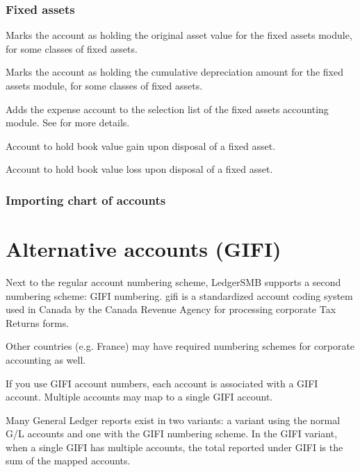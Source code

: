 \subsubsection{Fixed assets}
\label{subsubsec-coa-fixed-assets}

\begin{description}[style=nextline]
\item[Fixed asset (Fixed\_Asset)] Marks the account as holding the original asset value for the fixed
   assets module, for some classes of fixed assets.
\item[Depreciation (Asset\_Dep)] Marks the account as holding the cumulative depreciation amount
   for the fixed assets module, for some classes of fixed assets.
\item[Expense (asset\_expense)] Adds the expense account to the selection list of the fixed assets
   accounting module. See  for more details.
\item[Gain (asset\_gain)] Account to hold book value gain upon disposal of a fixed asset.
\item[Loss (asset\_loss)] Account to hold book value loss upon disposal of a fixed asset.
\end{description}

\subsubsection{Importing chart of accounts}
\label{subsubsec-coa-importing}

\section{Alternative accounts (GIFI)}
\label{sec-coa-gifi}

Next to the regular account numbering scheme, LedgerSMB supports a second
numbering scheme: GIFI numbering. \gls{gifi} is a standardized account 
coding system used in Canada by the Canada Revenue Agency for processing
corporate Tax Returns forms. 

Other countries (e.g. France) may have required numbering schemes for
corporate accounting as well.

If you use GIFI account numbers, each account is associated with a GIFI
account. Multiple accounts may map to a single GIFI account.

Many General Ledger reports exist in two variants: a variant using the
normal G/L accounts and one with the GIFI numbering scheme. In the GIFI
variant, when a single GIFI has multiple accounts, the total reported
under GIFI is the sum of the mapped accounts.



